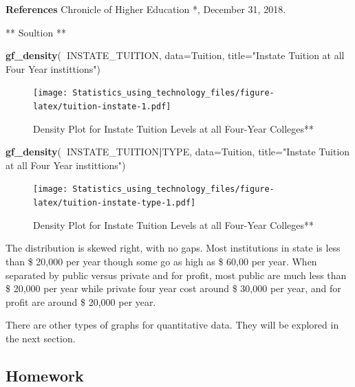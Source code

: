 \documentclass[
]{book}
\newenvironment{Shaded}{\begin{snugshade}}{\end{snugshade}}
\newcommand{\DataTypeTok}[1]{\textcolor[rgb]{0.13,0.29,0.53}{#1}}
\newcommand{\KeywordTok}[1]{\textcolor[rgb]{0.13,0.29,0.53}{\textbf{#1}}}
\newcommand{\NormalTok}[1]{#1}
\newcommand{\OperatorTok}[1]{\textcolor[rgb]{0.81,0.36,0.00}{\textbf{#1}}}
\newcommand{\StringTok}[1]{\textcolor[rgb]{0.31,0.60,0.02}{#1}}
\begin{document}
\textbf{References}
Chronicle of Higher Education *, December 31, 2018.

** Soultion **



\begin{Shaded}
\begin{Highlighting}[]
\KeywordTok{gf_density}\NormalTok{(}\OperatorTok{~}\NormalTok{INSTATE_TUITION, }\DataTypeTok{data=}\NormalTok{Tuition, }
           \DataTypeTok{title=}\StringTok{"Instate Tuition at all Four Year instittions"}\NormalTok{)}
\end{Highlighting}
\end{Shaded}

\begin{figure}
\centering
\texttt{[image: Statistics\_using\_technology\_files/figure-latex/tuition-instate-1.pdf]}
\caption{\label{fig:tuition-instate}Density Plot for Instate Tuition Levels at all Four-Year Colleges**}
\end{figure}



\begin{Shaded}
\begin{Highlighting}[]
\KeywordTok{gf_density}\NormalTok{(}\OperatorTok{~}\NormalTok{INSTATE_TUITION}\OperatorTok{|}\NormalTok{TYPE, }\DataTypeTok{data=}\NormalTok{Tuition, }
           \DataTypeTok{title=}\StringTok{"Instate Tuition at all Four Year instittions"}\NormalTok{)}
\end{Highlighting}
\end{Shaded}

\begin{figure}
\centering
\texttt{[image: Statistics\_using\_technology\_files/figure-latex/tuition-instate-type-1.pdf]}
\caption{\label{fig:tuition-instate-type}Density Plot for Instate Tuition Levels at all Four-Year Colleges**}
\end{figure}

The distribution is skewed right, with no gaps. Most institutions in state is less than \$ 20,000 per year though some go as high as \$ 60,00 per year. When separated by public versus private and for profit, most public are much less than \$ 20,000 per year while private four year cost around \$ 30,000 per year, and for profit are around \$ 20,000 per year.

There are other types of graphs for quantitative data. They will be explored in the next section.

\hypertarget{homework-1}{%
\subsection{Homework}\label{homework-1}}
\end{document}

